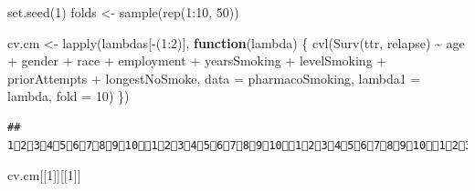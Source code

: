 \documentclass[
]{article}
\newenvironment{Shaded}{\begin{snugshade}}{\end{snugshade}}
\newcommand{\AttributeTok}[1]{\textcolor[rgb]{0.77,0.63,0.00}{#1}}
\newcommand{\ControlFlowTok}[1]{\textcolor[rgb]{0.13,0.29,0.53}{\textbf{#1}}}
\newcommand{\DecValTok}[1]{\textcolor[rgb]{0.00,0.00,0.81}{#1}}
\newcommand{\FunctionTok}[1]{\textcolor[rgb]{0.00,0.00,0.00}{#1}}
\newcommand{\NormalTok}[1]{#1}
\newcommand{\OtherTok}[1]{\textcolor[rgb]{0.56,0.35,0.01}{#1}}
\newcommand{\SpecialCharTok}[1]{\textcolor[rgb]{0.00,0.00,0.00}{#1}}
\begin{document}
\begin{Shaded}
\begin{Highlighting}[]
\FunctionTok{set.seed}\NormalTok{(}\DecValTok{1}\NormalTok{)}
\NormalTok{folds }\OtherTok{\textless{}{-}} \FunctionTok{sample}\NormalTok{(}\FunctionTok{rep}\NormalTok{(}\DecValTok{1}\SpecialCharTok{:}\DecValTok{10}\NormalTok{, }\DecValTok{50}\NormalTok{))}

\NormalTok{cv.cm }\OtherTok{\textless{}{-}} \FunctionTok{lapply}\NormalTok{(lambdas[}\SpecialCharTok{{-}}\NormalTok{(}\DecValTok{1}\SpecialCharTok{:}\DecValTok{2}\NormalTok{)], }\ControlFlowTok{function}\NormalTok{(lambda) \{}
  \FunctionTok{cvl}\NormalTok{(}\FunctionTok{Surv}\NormalTok{(ttr, relapse) }\SpecialCharTok{\textasciitilde{}}\NormalTok{ age }\SpecialCharTok{+}\NormalTok{ gender }\SpecialCharTok{+}\NormalTok{ race }\SpecialCharTok{+} 
\NormalTok{      employment }\SpecialCharTok{+}\NormalTok{ yearsSmoking }\SpecialCharTok{+}\NormalTok{ levelSmoking }\SpecialCharTok{+} 
\NormalTok{      priorAttempts }\SpecialCharTok{+}\NormalTok{ longestNoSmoke, }
      \AttributeTok{data =}\NormalTok{ pharmacoSmoking,}
      \AttributeTok{lambda1 =}\NormalTok{ lambda, }
      \AttributeTok{fold =} \DecValTok{10}\NormalTok{)}
\NormalTok{\})}
\end{Highlighting}
\end{Shaded}

\begin{verbatim}
## 1234567891012345678910123456789101234567891012345678910123456789101234567891012345678910123456789101234567891012345678910123456789101234567891012345678910123456789101234567891012345678910123456789101234567891012345678910123456789101234567891012345678910123456789101234567891012345678910123456789101234567891012345678910123456789101234567891012345678910123456789101234567891012345678910123456789101234567891012345678910123456789101234567891012345678910
\end{verbatim}

\begin{Shaded}
\begin{Highlighting}[]
\NormalTok{cv.cm[[}\DecValTok{1}\NormalTok{]][[}\DecValTok{1}\NormalTok{]]}
\end{Highlighting}
\end{Shaded}
\end{document}
